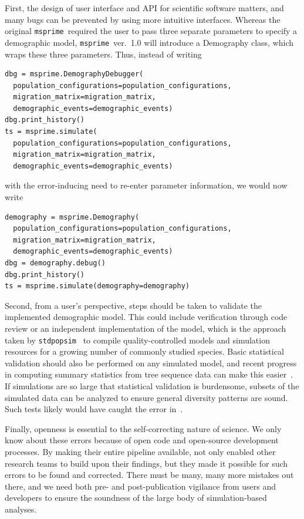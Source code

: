 \documentclass{article}
\newcommand{\msprime}[0]{\texttt{msprime}}
\newcommand{\stdpopsim}[0]{\texttt{stdpopsim}}
\begin{document}
First, the design of user interface and API for scientific software matters,
and many bugs can be prevented by using more intuitive interfaces.
Whereas the original \msprime\ required the user to pass
three separate parameters to specify a demographic model, \msprime~ver.~1.0
will introduce a Demography class, which wraps these three parameters.
Thus, instead of writing
\begin{lstlisting}[frame=single]
dbg = msprime.DemographyDebugger(
  population_configurations=population_configurations,
  migration_matrix=migration_matrix,
  demographic_events=demographic_events)
dbg.print_history()
ts = msprime.simulate(
  population_configurations=population_configurations,
  migration_matrix=migration_matrix,
  demographic_events=demographic_events)
\end{lstlisting}
with the error-inducing need to re-enter parameter information,
we would now write
\begin{lstlisting}[frame=single]
demography = msprime.Demography(
  population_configurations=population_configurations,
  migration_matrix=migration_matrix,
  demographic_events=demographic_events)
dbg = demography.debug()
dbg.print_history()
ts = msprime.simulate(demography=demography)
\end{lstlisting}

Second, from a user's perspective, steps should be taken to validate the implemented
demographic model. This could include verification through code review or an
independent implementation of the model, which is the approach taken by
\stdpopsim~\citep{adrion2019community} to compile quality-controlled
models and simulation resources for a growing number of commonly studied species.
Basic statistical validation should also be performed on any simulated model, and
recent progress in computing summary statistics from tree sequence data can make
this easier~\citep{ralph2020efficiently}. If simulations are so large that statistical
validation is burdensome, subsets of the simulated data can be analyzed to ensure
general diversity patterns are sound. Such tests likely would have caught the error
in~\citet{martin2017human}.

Finally, openness is essential to the self-correcting nature of science.
We only know about these errors because of open code and
open-source development processes. By making their entire pipeline available,
\citet{martin2017human} not only enabled other research teams to build upon their findings,
but they made it possible for such errors to be found and corrected.
There must be many, many more mistakes out there, and we need both
pre- and post-publication vigilance from users and developers to ensure the
soundness of the large body of simulation-based analyses.
\end{document}
